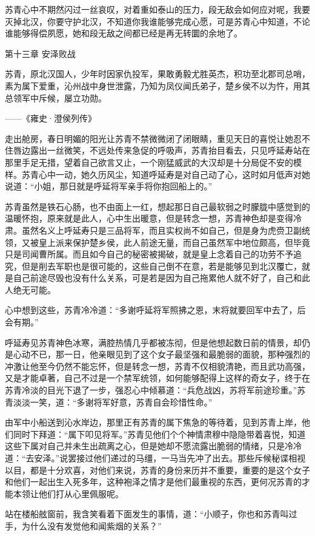 苏青心中不期然闪过一丝哀叹，对着重如泰山的压力，段无敌会如何应对呢，我要灭掉北汉，你要守护北汉，不知道你我谁能够完成心愿，可是苏青心中知道，不论谁能够得偿夙愿，她和段无敌之间都已经是再无转圜的余地了。

第十三章    安泽败战

苏青，原北汉国人，少年时因家仇投军，果敢勇毅尤胜英杰，积功至北郡司总哨，素为属下爱重，沁州战中身世泄露，乃知为凤仪闻氏弟子，楚乡侯不以为忤，用其总领军中斥候，屡立功勋。

——《雍史·澄侯列传》

走出舱房，春日明媚的阳光让苏青不禁微微闭了闭眼睛，重见天日的喜悦让她忍不住唇边露出一丝微笑，不远处传来急促的呼吸声，苏青抬目看去，只见呼延寿站在那里手足无措，望着自己欲言又止，一个刚猛威武的大汉却是十分局促不安的模样。苏青心中一动，她久历风尘，知道呼延寿是对自己动了心，这时如月低声对她说道：“小姐，那日就是呼延将军亲手将你抱回船上的。”

苏青虽然是铁石心肠，也不由面上一红，想起那日自己最软弱之时朦胧中感觉到的温暖怀抱，原来就是此人，心中生出暖意，但是转念一想，苏青神色却是变得冷肃。虽然名义上呼延寿只是三品将军，而且实权尚不如自己，但是身为虎赍卫副统领，又被皇上派来保护楚乡侯，此人前途无量，而自己虽然军中地位颇高，但毕竟只是司闻曹所属。而且如今自己的秘密被揭破，就是皇上念着自己的功劳不予追究，但是削去军职也是很可能的，这些自己倒不在意，若是能够见到北汉覆亡，就是自己前途尽毁也没有什么关系，可是若是因为自己拖累他人就不好了，自己和此人绝无可能。

心中想到这些，苏青冷冷道：“多谢呼延将军照拂之恩，末将就要回军中去了，后会有期。”

呼延寿见苏青神色冰寒，满腔热情几乎都被冻彻，但是他想起数日前的情景，却仍是心动不已，那一日，他亲眼见到了这个女子最坚强和最脆弱的面貌，那种强烈的冲激让他至今仍然不能忘怀，但是转念一想，苏青不仅相貌清艳，而且武功高强，又是才能卓著，自己不过是一个禁军统领，如何能够配得上这样的奇女子，终于在苏青冷淡的目光下退了一步，强忍心中倾慕道：“兵危战凶，苏将军前途珍重。”苏青淡淡一笑，道：“多谢将军好意，苏青自会珍惜性命。”

由军中小船送到沁水岸边，那里正有苏青的属下焦急的等待着，见到苏青上岸，他们同时下拜道：“属下叩见将军。”苏青见他们个个神情肃穆中隐隐带着喜悦，知道这些下属对自己并未生出疏离之心，但是她却不愿流露出脆弱的情绪，只是冷冷道：“去安泽。”说罢接过他们递过的马缰，一马当先冲了出去。那些斥候秘谍相视以目，都是十分欢喜，对他们来说，苏青的身份来历并不重要，重要的是这个女子和他们一起出生入死多年，这种袍泽之情才是他们最重视的东西，更何况苏青的才能本领让他们打从心里佩服呢。

站在楼船舷窗前，我含笑看着下面发生的事情，道：“小顺子，你也和苏青叫过手，为什么没有发觉他和闻紫烟的关系？”


